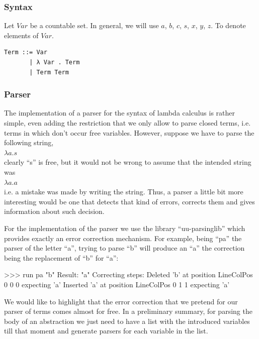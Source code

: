 \documentclass[a4paper,10pt]{article}
\newenvironment{code}{\footnotesize\verbatim}{\endverbatim\normalsize}
\begin{document}
\subsubsection{Syntax}

Let $Var$ be a countable set. In general, we will use $a$, $b$, $c$, $s$, $x$, $y$, $z$. To
denote elements of $Var$.

\begin{lstlisting}
Term ::= Var
       | λ Var . Term
       | Term Term
\end{lstlisting}

\subsubsection{Parser}

The implementation of a parser for the syntax of lambda calculus is rather simple,
even adding the restriction that we only allow to parse closed terms, i.e. terms in which
don't occur free variables. However, suppose we have to parse the following string,\\

$\lambda a . s$\\

clearly ``s'' is free, but it would not be wrong to assume that the intended string was\\

$\lambda a . a$\\

i.e. a mistake was made by writing the string. Thus, a parser a little bit
more interesting would be one that detects that kind of errors, corrects them
and gives information about such decision.

For the implementation of the parser we use the library ``uu-parsinglib''
which provides exactly an error correction mechanism. For example, being ``pa'' the
parser of the letter ``a'', trying to parse ``b'' will produce an ``a'' the correction
being the replacement of ``b'' for ``a'':

\begin{code}
 >>> run pa  "b"
     Result: "a"
     Correcting steps: 
       Deleted   'b' at position LineColPos 0 0 0 expecting 'a'
       Inserted  'a' at position LineColPos 0 1 1 expecting 'a'
\end{code}

We would like to highlight that the error correction that we pretend for our parser
of terms comes almost for free. In a preliminary summary, for parsing the body of an 
abstraction we just need to have a list with the introduced variables till that
moment and generate parsers for each variable in the list.\\
\end{document}
